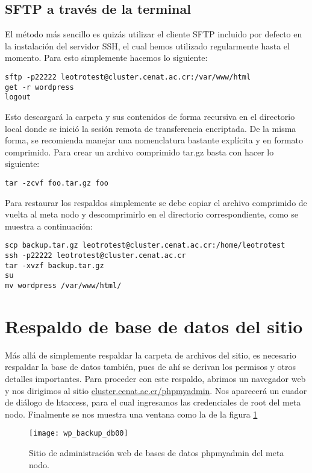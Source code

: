 \subsection{SFTP a través de la terminal}
El método más sencillo es quizás utilizar el cliente SFTP incluido por defecto  en la instalación del servidor SSH, el cual hemos utilizado regularmente hasta el momento. Para esto simplemente hacemos lo siguiente:

\begin{lstlisting}
sftp -p22222 leotrotest@cluster.cenat.ac.cr:/var/www/html
get -r wordpress
logout
\end{lstlisting}

Esto descargará la carpeta y sus contenidos de forma recursiva en el directorio local donde se inició la sesión remota de transferencia encriptada. De la misma forma, se recomienda manejar una nomenclatura bastante explícita y en formato comprimido. Para crear un archivo comprimido tar.gz basta con hacer lo siguiente:

\begin{lstlisting}
tar -zcvf foo.tar.gz foo
\end{lstlisting}

Para restaurar los respaldos simplemente se debe copiar el archivo comprimido de vuelta al meta nodo y descomprimirlo en el directorio correspondiente, como se muestra a continuación:

\begin{lstlisting}
scp backup.tar.gz leotrotest@cluster.cenat.ac.cr:/home/leotrotest
ssh -p22222 leotrotest@cluster.cenat.ac.cr
tar -xvzf backup.tar.gz
su
mv wordpress /var/www/html/
\end{lstlisting}

\section{Respaldo de base de datos del sitio}
Más allá de simplemente respaldar la  carpeta de archivos del sitio, es necesario respaldar la base de datos también, pues de ahí se derivan los permisos y otros detalles importantes. Para proceder con este respaldo, abrimos  un navegador web y nos dirigimos al sitio \url{cluster.cenat.ac.cr/phpmyadmin}. Nos aparecerá un cuador de diálogo de htaccess, para el cual ingresamos las credenciales de root del meta nodo. Finalmente se nos muestra una ventana como la de la figura \ref{fig:wp_backup_db00}

\begin{figure}[H]
\centering
\texttt{[image: wp\_backup\_db00]}
\caption{Sitio de administración web de bases de datos phpmyadmin del meta nodo.}
\label{fig:wp_backup_db00}
\end{figure}

